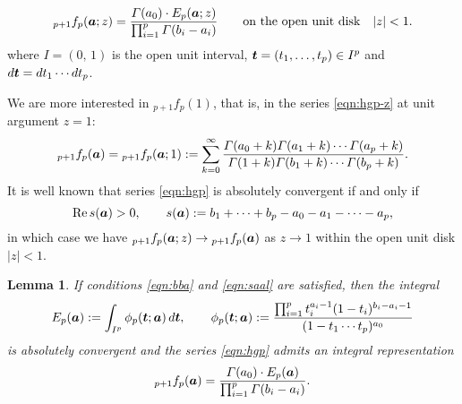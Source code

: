 \documentclass[a4paper,12pt]{article}
\theoremstyle{plain}
\newtheorem{lemma}[theorem]{Lemma}
\def\rRe{\mathrm{Re}}
\def\vG{\varGamma}
\def\ba{\mbox{\boldmath $a$}}
\def\bt{\mbox{\boldmath $t$}}
\begin{document}
\begin{equation} \label{eqn:eif-z}
{}_{p+1}f_p( \ba ; z)
= \dfrac{ \vG( a_0 ) \cdot 
E_p( \ba ; z )}{\prod_{i=1}^p \vG( b_i-a_i )} 
\qquad \mbox{on the open unit disk} \quad |z| < 1.    
\end{equation}
where $I = (0, \, 1)$ is the open unit interval,  
$\bt = (t_1, \dots, t_p) \in I^p$ and $d \bt = d t_1 \cdots d t_p$. 
\par
We are more interested in ${}_{p+1}f_p(1)$, that is, in the series 
\eqref{eqn:hgp-z} at unit argument $z = 1$: 
\begin{equation} \label{eqn:hgp}
{}_{p+1}f_p( \ba ) = {}_{p+1}f_p( \ba; 1 ) 
:= \sum_{k=0}^{\infty} \dfrac{\vG(a_0+k) \vG(a_1+k) \cdots 
\vG(a_p+k)}{\vG(1+k) \vG(b_1+k) \cdots \vG(b_p+k)}.  
\end{equation}
It is well known that series \eqref{eqn:hgp} is absolutely convergent 
if and only if    
\begin{equation} \label{eqn:saal}
\rRe \, s(\ba) > 0, \qquad 
s( \ba ) := b_1 + \cdots + b_p - a_0 - a_1 - \cdots - a_p,    
\end{equation}
in which case we have ${}_{p+1}f_p( \ba; z ) \to {}_{p+1}f_p( \ba )$ as 
$z \to 1$ within the open unit disk $|z| < 1$. 
\begin{lemma} \label{lem:eu} 
If conditions \eqref{eqn:bba} and \eqref{eqn:saal} are satisfied, 
then the integral  
\begin{equation} \label{eqn:eu}
E_p( \ba ) 
:= \int_{I^p} \phi_p( \bt ; \ba ) \, d \bt, \qquad   
\phi_p( \bt ; \ba ) 
:=  \dfrac{ \prod_{i=1}^p t_i^{a_i-1} 
(1-t_i)^{b_i-a_i-1}}{(1- t_1 \cdots t_p)^{a_0}} 
\end{equation}
is absolutely convergent and the series \eqref{eqn:hgp} admits an 
integral representation 
\begin{equation} \label{eqn:eif}
{}_{p+1}f_p( \ba ) = \dfrac{\vG( a_0 ) \cdot 
E_p( \ba ) }{\prod_{i=1}^p \vG( b_i-a_i )}.    
\end{equation}
\end{lemma}
\end{document}
